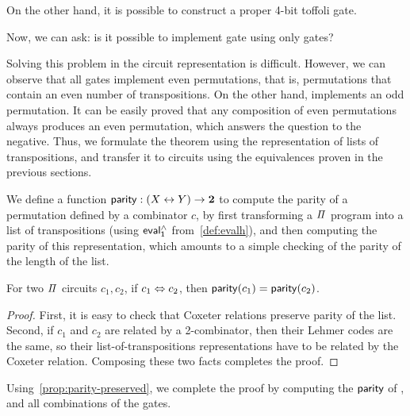\noindent
On the other hand, it is possible to construct a proper 4-bit toffoli gate.
\medskip
\toffoli{}

\noindent
Now, we can ask: is it possible to implement  gate using only  gates?
\medskip

Solving this problem in the circuit representation is difficult. However, we can observe that all  gates
implement even permutations, that is, permutations that contain an even number of transpositions. On the other hand,
 implements an odd permutation. It can be easily proved that any composition of even permutations always
produces an even permutation, which answers the question to the negative. Thus, we formulate the theorem using the
representation of lists of transpositions, and transfer it to circuits using the equivalences proven in the previous
sections.

We define a function $\operatorname{\mathsf{parity}} : (X \mathrel{\leftrightarrow} Y) \to {\mathbf{2}}$ to compute the parity of a permutation defined by a combinator
$c$, by first transforming a $\mathit{\Pi}$ program into a list of transpositions (using $\evalh_{1}$ from~\cref{def:evalh}),
and then computing the parity of this representation, which amounts to a simple checking of the parity of the length of
the list.

\begin{propositionrep}
  \label{prop:parity-preserved}
  For two $\mathit{\Pi}$ circuits $c_1, c_2$, if $c_1 \mathrel{\Leftrightarrow} c_2$, then $\operatorname{\mathsf{parity}}(c_1) = \operatorname{\mathsf{parity}}(c_2)$.
\end{propositionrep}
\begin{proof}
  First, it is easy to check that Coxeter relations preserve parity of the list. Second, if $c_1$ and $c_2$ are related
  by a 2-combinator, then their Lehmer codes are the same, so their list-of-transpositions representations have to be
  related by the Coxeter relation. Composing these two facts completes the proof.
\end{proof}

\noindent
Using~\cref{prop:parity-preserved}, we complete the proof by computing the $\operatorname{\mathsf{parity}}$ of , and all
combinations of the  gates.


